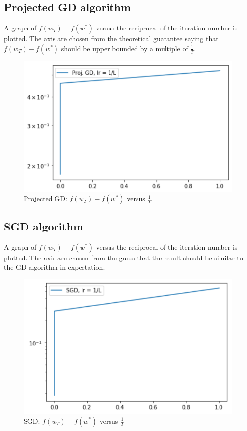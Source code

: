\documentclass[10pt,conference,compsocconf]{IEEEtran}
\begin{document}
\subsection{Projected GD algorithm}
A graph of $f(w_T)-f(w^*)$ versus the reciprocal of the iteration number is plotted. The axis are chosen from the theoretical guarantee saying that $f(w_T)-f(w^*)$ should be upper bounded by a multiple of $\frac{1}{T}$.
\begin{figure}[tbp]
  \centering
  \includegraphics[width=\columnwidth]{projgd}
  \caption{Projected GD: $f(w_T)-f(w^*)$ versus $\frac{1}{T}$}
  \vspace{-3mm}
  \label{fig:projgd}
\end{figure}

\subsection{SGD algorithm}
A graph of $f(w_T)-f(w^*)$ versus the reciprocal of the iteration number is plotted. The axis are chosen from the guess that the result should be similar to the GD algorithm in expectation.
\begin{figure}[tbp]
  \centering
  \includegraphics[width=\columnwidth]{sgd}
  \caption{SGD: $f(w_T)-f(w^*)$ versus $\frac{1}{T}$}
  \vspace{-3mm}
  \label{fig:sgd}
\end{figure}
\end{document}
